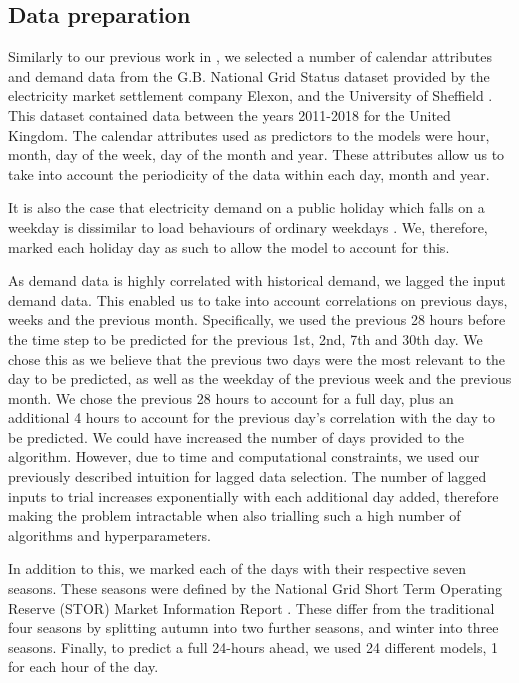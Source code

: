 \documentclass[final,3p,times,twocolumn,numbers]{elsarticle}
\begin{document}

\subsection{Data preparation}

Similarly to our previous work in \cite{Kell2018a}, we selected a number of calendar attributes and demand data from the G.B. National Grid Status dataset provided by the electricity market settlement company Elexon, and the University of Sheffield \cite{gbnationalgridstatus_2019}. This dataset contained data between the years 2011-2018 for the United Kingdom. The calendar attributes used as predictors to the models were hour, month, day of the week, day of the month and year. These attributes allow us to take into account the periodicity of the data within each day, month and year.

It is also the case that electricity demand on a public holiday which falls on a weekday is dissimilar to load behaviours of ordinary weekdays \cite{Kim2000}. We, therefore, marked each holiday day as such to allow the model to account for this.

As demand data is highly correlated with historical demand, we lagged the input demand data. This enabled us to take into account correlations on previous days, weeks and the previous month. Specifically, we used the previous 28 hours before the time step to be predicted for the previous 1st, 2nd, 7th and 30th day. We chose this as we believe that the previous two days were the most relevant to the day to be predicted, as well as the weekday of the previous week and the previous month. We chose the previous 28 hours to account for a full day, plus an additional 4 hours to account for the previous day's correlation with the day to be predicted. We could have increased the number of days provided to the algorithm. However, due to time and computational constraints, we used our previously described intuition for lagged data selection. The number of lagged inputs to trial increases exponentially with each additional day added, therefore making the problem intractable when also trialling such a high number of algorithms and hyperparameters. 

In addition to this, we marked each of the days with their respective seven seasons. These seasons were defined by the National Grid Short Term Operating Reserve (STOR) Market Information Report \cite{ESO2019}. These differ from the traditional four seasons by splitting autumn into two further seasons, and winter into three seasons. Finally, to predict a full 24-hours ahead, we used 24 different models, 1 for each hour of the day. 
\end{document}
